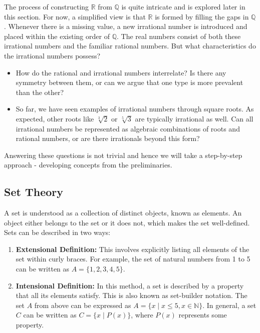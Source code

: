 The process of constructing $\mathbb{R}$ from $\mathbb{Q}$ is quite intricate and is explored later in this section. For now, a simplified view is that $\mathbb{R}$ is formed by filling the gaps in $\mathbb{Q}$. Whenever there is a missing value, a new irrational number is introduced and placed within the existing order of $\mathbb{Q}$. The real numbers consist of both these irrational numbers and the familiar rational numbers. But what characteristics do the irrational numbers possess? 

\begin{itemize}
    \item How do the rational and irrational numbers interrelate? Is there any symmetry between them, or can we argue that one type is more prevalent than the other? 
    \item So far, we have seen examples of irrational numbers through square roots. As expected, other roots like $\sqrt[3]{2}$ or $\sqrt[5]{3}$ are typically irrational as well. Can all irrational numbers be represented as algebraic combinations of roots and rational numbers, or are there irrationals beyond this form?
\end{itemize}

Answering these questions is not trivial and hence we will take a step-by-step approach - developing concepts from the preliminaries. 

\subsection{Set Theory}\cite{probabilityfoundations}

A set is understood as a collection of distinct objects, known as elements. An object either belongs to the set or it does not, which makes the set well-defined. Sets can be described in two ways:

\begin{enumerate}
    \item \textbf{Extensional Definition:} This involves explicitly listing all elements of the set within curly braces. For example, the set of natural numbers from 1 to 5 can be written as \( A = \{1, 2, 3, 4, 5\} \).
    \item \textbf{Intensional Definition:} In this method, a set is described by a property that all its elements satisfy. This is also known as set-builder notation. The set \( A \) from above can be expressed as \( A = \{x \mid x \leq 5, x \in \mathbb{N}\} \). In general, a set \( C \) can be written as \( C = \{x \mid P(x)\} \), where \( P(x) \) represents some property.
\end{enumerate}

